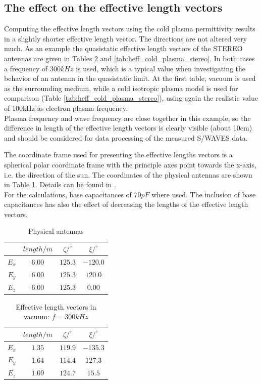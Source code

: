 \documentclass[draft,ras]{agutex}
\begin{document}
\begin{article}
\subsection{The effect on the effective length vectors}
Computing the effective length vectors using the cold plasma permittivity results in a slightly shorter effective length vector. The directions are not altered very much. As an example the quasistatic effective length vectors of the STEREO antennas are given in Tables \ref{tab:heff_vacuum_stereo} and \ref{tab:heff_cold_plasma_stereo}. In both cases a frequency of $300kHz$ is used, which is a typical value when investigating the behavior of an antenna in the quasistatic limit. At the first table, vacuum is used as the surrounding medium, while a cold isotropic plasma model is used for comparison (Table \ref{tab:heff_cold_plasma_stereo}), using again the realistic value of 100kHz as electron plasma frequency.\\

Plasma frequency and wave frequency are close together in this example, so the difference in length of the effective length vectors is clearly visible (about 10cm) and should be considered for data processing of the measured S/WAVES data.

The coordinate frame used for presenting the effective lengths vectors is a spherical polar coordinate frame with the principle axes point towards the x-axis, i.e. the direction of the sun. The coordinates of the physical antennas are shown in Table \ref{tab:phys_ant}. Details can be found in \cite{ossi09}. \\

For the calculations, base capacitances of $70pF$ where used. The inclusion of base capacitances has also the effect of decreasing the lengths of the effective length vectors.\\
\begin{table}
\caption{Physical antennas}
\label{tab:phys_ant}
\begin{tabular}{|c|c|c|c|}
 \hline
 & $length/m$ & $\zeta/^\circ$ & $\xi/^\circ$ \\
\hline
$E_x$ & $6.00$ & $125.3$ & $-120.0$ \\
$E_y$ & $6.00$ & $125.3$ & $120.0$ \\
$E_z$ & $6.00$ & $125.3$ & $0.00$ \\
\hline\end{tabular}
\end{table}

\begin{table}
\caption{Effective length vectors in vacuum: $f=300kHz$}
\label{tab:heff_vacuum_stereo}
\begin{tabular}{|c|c|c|c|}
 \hline
 & $length/m$ & $\zeta/^\circ$ & $\xi/^\circ$ \\
\hline
$E_x$ & $1.35$ & $119.9$ & $-135.3$ \\
$E_y$ & $1.64$ & $114.4$ & $127.3$ \\
$E_z$ & $1.09$ & $124.7$ & $15.5$ \\
\hline\end{tabular}
\end{table}




\end{article}
\end{document}
